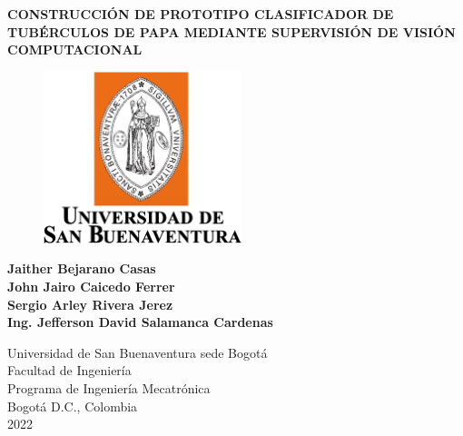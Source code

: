 \cleardoublepage

\thispagestyle{empty} 
\begin{center}
\textbf{ 
\LARGE{CONSTRUCCIÓN DE PROTOTIPO CLASIFICADOR DE TUBÉRCULOS DE PAPA MEDIANTE SUPERVISIÓN DE VISIÓN COMPUTACIONAL}}\\[1cm]


\begin{figure}[htbp]
	\centering
		\includegraphics[height=5cm,keepaspectratio]{OtrosTex/LogoUSB}
\end{figure}

\vspace*{2cm} 
\Large\textbf{Jaither Bejarano Casas \\ John Jairo Caicedo Ferrer \\Sergio Arley Rivera Jerez}\\[1.0cm]

\vspace*{0.2cm} 
\Large\textbf{Ing. 	Jefferson David Salamanca Cardenas}

\vspace*{1.2cm} 
\Large{Universidad de San Buenaventura sede Bogotá}\\
\Large{Facultad de Ingeniería}\\
\Large{Programa de Ingeniería Mecatrónica}\\
\large{Bogotá D.C., Colombia\\
2022}\\
\end{center}

\newpage{\pagestyle{empty}\cleardoublepage}
\newpage
%
